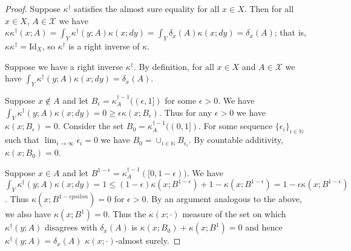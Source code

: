 \begin{proof}
Suppose $\kappa^\dagger$ satisfies the almost sure equality for all $x\in X$. Then for all $x\in X$, $A\in \mathcal{X}$ we have $\kappa \kappa^\dagger (x;A) = \int_Y \kappa^\dagger(y;A) \kappa(x;dy) = \int_Y \delta_x (A) \kappa(x;dy) = \delta_x(A)$; that is, $\kappa\kappa^\dagger = \mathrm{Id}_X$, so $\kappa^\dagger$ is a right inverse of $\kappa$.

Suppose we have a right inverse $\kappa^\dagger$. By definition, for all $x\in X$ and $A\in\mathcal{X}$ we have $\int_Y \kappa^\dagger(y;A) \kappa(x;dy)=\delta_x(A)$. 

Suppose $x\not\in A$ and let $B_\epsilon=\kappa^{\dagger-1}_A((\epsilon,1])$ for some $\epsilon>0$. We have $\int_Y \kappa^\dagger(y;A) \kappa(x;dy)=0\geq\epsilon\kappa(x;B_\epsilon)$. Thus for any $\epsilon>0$ we have $\kappa(x;B_\epsilon)=0$. Consider the set $B_0=\kappa^{\dagger-1}_A((0,1])$. For some sequence $\{\epsilon_i\}_{i\in \mathbb{N}}$ such that $\lim_{i\to\infty} \epsilon_i = 0$ we have $B_0=\cup_{i\in\mathbb{N}} B_{\epsilon_i}$. By countable additivity, $\kappa(x;B_0)=0$. 

Suppose $x\in A$ and let $B^{1-\epsilon}=\kappa^{\dagger-1}_A([0,1-\epsilon))$. We have $\int_Y \kappa^\dagger(y;A) \kappa(x;dy)=1\leq(1-\epsilon)\kappa(x;B^{1-\epsilon})+1-\kappa(x;B^{1-\epsilon})=1-\epsilon \kappa(x;B^{1-\epsilon})$. Thus $\kappa(x;B^{1-epsilon})=0$ for $\epsilon>0$. By an argument analogous to the above, we also have $\kappa(x;B^1)=0$. Thus the $\kappa(x;\cdot)$ measure of the set on which $\kappa^\dagger(y;A)$ disagrees with $\delta_x(A)$ is $\kappa(x;B_0) + \kappa(x;B^1)=0$ and hence $\kappa^\dagger(y;A)=\delta_x(A)$ $\kappa(x;\cdot)$-almost surely.
\end{proof}




